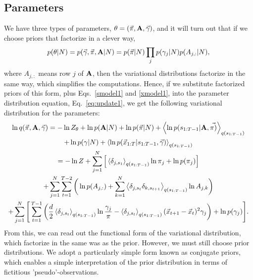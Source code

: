 \subsection{Parameters}
We have three types of parameters,
$\theta=(\vec\pi,\mathbf{A},\vec \gamma)$, and it will turn out that
if we choose priors that factorize in a clever way,
\begin{equation}\label{pfactorization}
p(\theta|N)=p(\vec{\gamma},\vec{\pi},\mathbf{A}|N)=p(\vec\pi|N)\prod_jp(\gamma_j|N)p(A_{j,:}|N),
\end{equation}
where $A_{j,:}$ means row $j$ of $\mathbf{A}$, then the variational
distributions factorize in the same way, which simplifies the
computations. Hence, if we substitute factorized priors of this form,
plus Eqs.~\eqref{smodel1} and \eqref{xmodel1}, into the parameter
distribution equation, Eq.~\eqref{eq:update1}, we get the following
variational distribution for the parameters:
\begin{multline}\label{Maverage}
  \ln q(\vec{\pi},\matris{A},\vec{\gamma})=
  -\ln Z_\theta  
    +\ln p(\matris{A}|N)+\ln p(\vec{\pi}|N)
    +\mean{\ln p(s_{1:T-1}|\matris{A},\vec{\pi)}}_{q(s_{1:T-1})}\\
  +\ln p(\gamma|N)+\mean{\ln p(\x_{1:T}|s_{1:T-1},\vec{\gamma})}_{q(s_{1:T-1})}\\
  =-\ln Z +\sum_{j=1}^N\Big[\mean{\delta_{j,s_1}}_{q(s_{1:T-1})}\ln\pi_j+\ln p(\pi_j)\Big]\\
  +\sum_{j=1}^N\sum_{t=1}^{T-2}\bigg(
    \ln p(A_{j,:})+\sum_{k=1}^N\mean{\delta_{j,s_t}\delta_{k,s_{t+1}}}_{q(s_{1:T-1})}\ln A_{j,k}
    \bigg)\\%
  +\sum_{j=1}^N\Bigg[\sum_{t=1}^{T-1}
  \bigg(
  \frac d2\mean{\delta_{j,s_t}}_{q(s_{1:T-1})}\ln\frac{\gamma_j}{\pi}
  -\mean{\delta_{j,s_t}}_{q(s_{1:T-1})}(\x_{t+1}-\x_t)^2\gamma_j
  \bigg)+\ln p(\gamma_j)\Bigg].
\end{multline}
From this, we can read out the functional form of the variational
distribution, which factorize in the same was as the prior. However, we must
still choose prior distributions. We adopt a particularly simple form
known as conjugate priors\cite{Mackay1997,Beal2003}, which enables
a simple interpretation of the prior distribution in terms of
fictitious 'pseudo'-observations.

